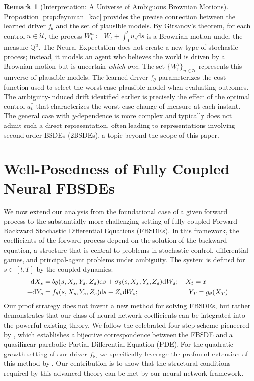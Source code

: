 \documentclass[qian]{imsart}
\newcommand{\dd}{\mathrm{d}}
\theoremstyle{plain}
\theoremstyle{definition}
\newtheorem{remark}[theorem]{Remark}
\begin{document}
\begin{remark}[Interpretation: A Universe of Ambiguous Brownian Motions]
\label{rem:girsanov_interpretation_revised}
Proposition \ref{prop:feynman_kac} provides the precise connection between the learned driver $f_\theta$ and the set of plausible models. By Girsanov's theorem, for each control $u \in \mathcal{U}$, the process $W^u_t \coloneqq W_t + \int_0^t u_s \dd s$ is a Brownian motion under the measure $\mathbb{Q}^u$. The Neural Expectation does not create a new type of stochastic process; instead, it models an agent who believes the world is driven by a Brownian motion but is uncertain \emph{which one}. The set $\{W^u_t\}_{u \in \mathcal{U}}$ represents this universe of plausible models. The learned driver $f_\theta$ parameterizes the cost function used to select the worst-case plausible model when evaluating outcomes. The ambiguity-induced drift identified earlier is precisely the effect of the optimal control $u^*_t$ that characterizes the worst-case change of measure at each instant. The general case with $y$-dependence is more complex and typically does not admit such a direct representation, often leading to representations involving second-order BSDEs (2BSDEs), a topic beyond the scope of this paper.
\end{remark}


\section{Well-Posedness of Fully Coupled Neural FBSDEs}
\label{sec:fbsde_main_result_section}

We now extend our analysis from the foundational case of a given forward process to the substantially more challenging setting of fully coupled Forward-Backward Stochastic Differential Equations (FBSDEs). In this framework, the coefficients of the forward process depend on the solution of the backward equation, a structure that is central to problems in stochastic control, differential games, and principal-agent problems under ambiguity. The system is defined for $s \in [t,T]$ by the coupled dynamics:
\begin{align}
    \dd X_s &= b_\theta(s, X_s, Y_s, Z_s) \dd s + \sigma_\theta(s, X_s, Y_s, Z_s) \dd W_s; \quad X_t = x \label{eq:fbsde_full_fwd} \\
    -\dd Y_s &= f_\theta(s, X_s, Y_s, Z_s) \dd s - Z_s \dd W_s; \quad \hspace{2.2cm} Y_T = g_\theta(X_T) \label{eq:fbsde_full_bwd}
\end{align}
Our proof strategy does not invent a new method for solving FBSDEs, but rather demonstrates that our class of neural network coefficients can be integrated into the powerful existing theory. We follow the celebrated four-step scheme pioneered by \cite{MaProtterYong1994}, which establishes a bijective correspondence between the FBSDE and a quasilinear parabolic Partial Differential Equation (PDE). For the quadratic growth setting of our driver $f_\theta$, we specifically leverage the profound extension of this method by \cite{Delarue2002}. Our contribution is to show that the structural conditions required by this advanced theory can be met by our neural network framework.
\end{document}
